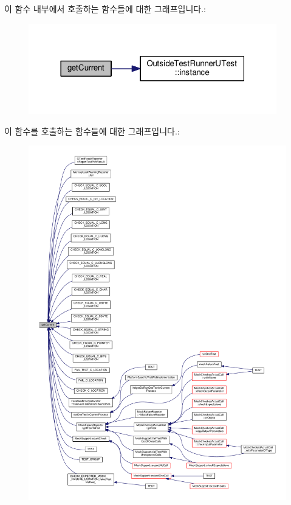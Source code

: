 이 함수 내부에서 호출하는 함수들에 대한 그래프입니다.\+:
\nopagebreak
\begin{figure}[H]
\begin{center}
\leavevmode
\includegraphics[width=306pt]{class_utest_shell_afeb97f1f06324a42444c71b412655122_cgraph}
\end{center}
\end{figure}




이 함수를 호출하는 함수들에 대한 그래프입니다.\+:
\nopagebreak
\begin{figure}[H]
\begin{center}
\leavevmode
\includegraphics[width=350pt]{class_utest_shell_afeb97f1f06324a42444c71b412655122_icgraph}
\end{center}
\end{figure}


